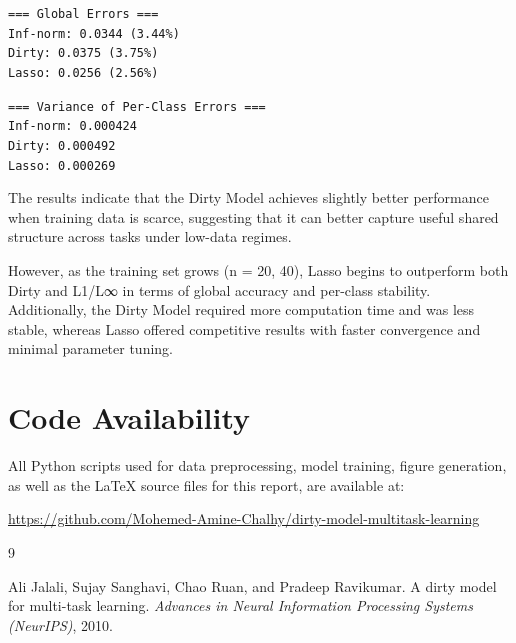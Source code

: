 \documentclass{article}
\begin{document}
\texttt{=== Global Errors ===} \\
\texttt{Inf-norm:  0.0344 (3.44\%)} \\
\texttt{Dirty:     0.0375 (3.75\%)} \\
\texttt{Lasso:     0.0256 (2.56\%)}

\texttt{=== Variance of Per-Class Errors ===} \\
\texttt{Inf-norm:  0.000424} \\
\texttt{Dirty:     0.000492} \\
\texttt{Lasso:     0.000269}



\bigskip
The results indicate that the Dirty Model achieves slightly better performance when training data is scarce, suggesting that it can better capture useful shared structure across tasks under low-data regimes.

However, as the training set grows (n = 20, 40), Lasso begins to outperform both Dirty and L1/L∞ in terms of global accuracy and per-class stability.
Additionally, the Dirty Model required more computation time and was less stable, whereas Lasso offered competitive results with faster convergence and minimal parameter tuning.

\section{Code Availability}
All Python scripts used for data preprocessing, model training, figure generation, as well as the LaTeX source files for this report, are available at:

\url{https://github.com/Mohemed-Amine-Chalhy/dirty-model-multitask-learning}


\begin{thebibliography}{9}

Ali Jalali, Sujay Sanghavi, Chao Ruan, and Pradeep Ravikumar.
\newblock A dirty model for multi-task learning.
\newblock \emph{Advances in Neural Information Processing Systems (NeurIPS)}, 2010.

\end{thebibliography}
\end{document}
